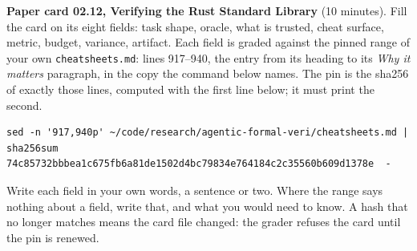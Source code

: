 \documentclass[11pt]{article}
\begin{document}
\begin{problem}\label{prob:B2}
\textbf{Paper card 02.12, Verifying the Rust Standard Library} (10 minutes).
Fill the card on its eight fields: task shape, oracle, what is trusted, cheat
surface, metric, budget, variance, artifact. Each field is graded against the
pinned range of your own \texttt{cheatsheets.md}: lines 917--940, the entry
from its heading to its \emph{Why it matters} paragraph, in the copy the
command below names. The pin is the sha256 of exactly those lines, computed
with the first line below; it must print the second.
{\small
\begin{verbatim}
sed -n '917,940p' ~/code/research/agentic-formal-veri/cheatsheets.md | sha256sum
74c85732bbbea1c675fb6a81de1502d4bc79834e764184c2c35560b609d1378e  -
\end{verbatim}
}
Write each field in your own words, a sentence or two. Where the range says
nothing about a field, write that, and what you would need to know. A hash
that no longer matches means the card file changed: the grader refuses the
card until the pin is renewed.
\end{problem}
\end{document}
